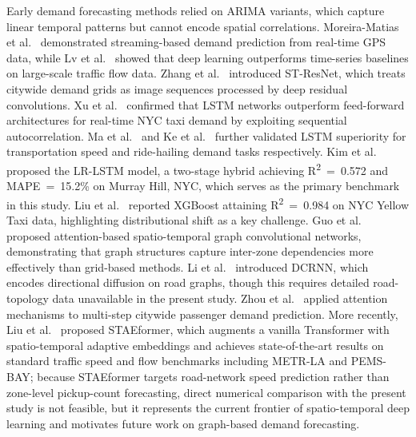 \documentclass[a4paper,fleqn]{cas-dc}
\begin{document}
Early demand forecasting methods relied on ARIMA variants, which capture linear temporal patterns but cannot encode spatial correlations.  Moreira-Matias et al.~\cite{moreira2013predicting} demonstrated streaming-based demand prediction from real-time GPS data, while Lv et al.~\cite{lv2015traffic} showed that deep learning outperforms time-series baselines on large-scale traffic flow data.  Zhang et al.~\cite{zhang2017deep} introduced ST-ResNet, which treats citywide demand grids as image sequences processed by deep residual convolutions.  Xu et al.~\cite{xu2017realtime} confirmed that LSTM networks outperform feed-forward architectures for real-time NYC taxi demand by exploiting sequential autocorrelation.  Ma et al.~\cite{ma2015long} and Ke et al.~\cite{ke2017short} further validated LSTM superiority for transportation speed and ride-hailing demand tasks respectively.  Kim et al.~\cite{kim2020hybrid} proposed the LR-LSTM model, a two-stage hybrid achieving R\textsuperscript{2}~=~0.572 and MAPE~=~15.2\% on Murray Hill, NYC, which serves as the primary benchmark in this study.  Liu et al.~\cite{liu2021epidemic} reported XGBoost attaining R\textsuperscript{2}~=~0.984 on NYC Yellow Taxi data, highlighting distributional shift as a key challenge.  Guo et al.~\cite{guo2019attention} proposed attention-based spatio-temporal graph convolutional networks, demonstrating that graph structures capture inter-zone dependencies more effectively than grid-based methods.  Li et al.~\cite{li2018diffusion} introduced DCRNN, which encodes directional diffusion on road graphs, though this requires detailed road-topology data unavailable in the present study.  Zhou et al.~\cite{zhou2018predicting} applied attention mechanisms to multi-step citywide passenger demand prediction.  More recently, Liu et al.~\cite{liu2023staeformer} proposed STAEformer, which augments a vanilla Transformer with spatio-temporal adaptive embeddings and achieves state-of-the-art results on standard traffic speed and flow benchmarks including METR-LA and PEMS-BAY; because STAEformer targets road-network speed prediction rather than zone-level pickup-count forecasting, direct numerical comparison with the present study is not feasible, but it represents the current frontier of spatio-temporal deep learning and motivates future work on graph-based demand forecasting.
\end{document}
